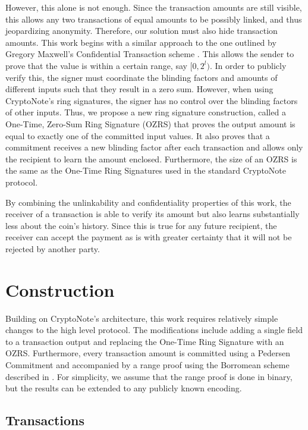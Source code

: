 \documentclass{article}
\begin{document}
However, this alone is not enough.  Since the transaction amounts are still
visible, this allows any two transactions of equal amounts to be possibly
linked, and thus jeopardizing anonymity.  Therefore, our solution must also
hide transaction amounts.  This work begins with a similar approach to the one
outlined by Gregory Maxwell's Confidential Transaction scheme \cite{M15}.  This
allows the sender to prove that the value is within a certain range, say
$[0,2^l)$.  In order to publicly verify this, the signer must coordinate the
blinding factors and amounts of different inputs such that they result in a zero
sum.  However, when using CryptoNote's ring signatures, the signer has no
control over the blinding factors of other inputs.  Thus, we propose a new ring
signature construction, called a One-Time, Zero-Sum Ring Signature (OZRS) that
proves the output amount is equal to exactly one of the committed input values.
It also proves that a commitment receives a new blinding factor after each
transaction and allows only the recipient to learn the amount enclosed.
Furthermore, the size of an OZRS is the same as the One-Time Ring Signatures
used in the standard CryptoNote protocol.

By combining the unlinkability and confidentiality properties of this work, the
receiver of a transaction is able to verify its amount but also learns
substantially less about the coin's history.  Since this is true for any future
recipient, the receiver can accept the payment as is with greater certainty that
it will not be rejected by another party.

\section{Construction}

Building on CryptoNote's architecture, this work requires relatively simple
changes to the high level protocol.  The modifications include adding a single
field to a transaction output and replacing the One-Time Ring Signature with an
OZRS.  Furthermore, every transaction amount is committed using a Pedersen
Commitment and accompanied by a range proof using the Borromean scheme described
in \cite{MP15}.  For simplicity, we assume that the range proof is done in
binary, but the results can be extended to any publicly known encoding.

\subsection{Transactions}
\end{document}

